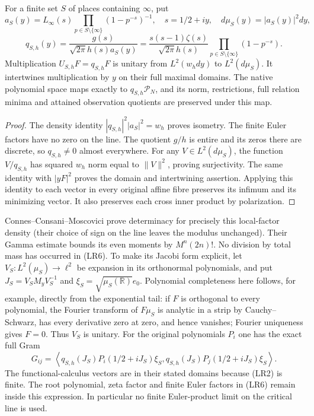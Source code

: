 \begin{hzocproposition}
For a finite set $S$ of places containing $\infty$, put
\[
 a_S(y)=L_\infty(s)\prod_{p\in S\setminus\{\infty\}}
 (1-p^{-s})^{-1},\quad s=1/2+iy,\quad d\mu_S(y)=|a_S(y)|^2dy,
\]
\[
 q_{S,h}(y)=\frac{g(s)}{\sqrt{2\pi}h(s)a_S(y)}
 =\frac{s(s-1)\zeta(s)}{\sqrt{2\pi}h(s)}
 \prod_{p\in S\setminus\{\infty\}}(1-p^{-s}).\tag{LR6}
\]
Multiplication $U_{S,h}F=q_{S,h}F$ is unitary from
$L^2(w_hdy)$ to $L^2(d\mu_S)$. It intertwines multiplication by $y$
on their full maximal domains. The native polynomial space maps exactly
to $q_{S,h}\mathcal P_N$, and its norm, restrictions, full relation
minima and attained observation quotients are preserved under this map.
\end{hzocproposition}
\begin{proof}
The density identity $|q_{S,h}|^2|a_S|^2=w_h$ proves isometry.
The finite Euler factors have no zero on the line. The quotient $g/h$
is entire and its zeros there are discrete, so $q_{S,h}\ne0$ almost
everywhere. For any $V\in L^2(d\mu_S)$, the function $V/q_{S,h}$
has squared $w_h$ norm equal to $\|V\|^2$, proving surjectivity.
The same identity with $|yF|^2$ proves the domain and intertwining
assertion. Applying this identity to each vector in every original
affine fibre preserves its infimum and its minimizing vector.
It also preserves each cross inner product by polarization.
\end{proof}

Connes--Consani--Moscovici \cite[\S3.2, Proposition 3.1]{hzoc:CCM}
prove determinacy for precisely this local-factor density (their
choice of sign on the line leaves the modulus unchanged).
Their Gamma estimate bounds its even moments by $M^n(2n)!$.
No division by total mass has occurred in (LR6). To make its Jacobi
form explicit, let $V_S:L^2(\mu_S)\longrightarrow\ell^2$ be expansion
in its orthonormal polynomials, and put
$J_S=V_SM_yV_S^{-1}$ and $\xi_S=\sqrt{\mu_S(\mathbb R)}e_0$.
Polynomial completeness here follows, for example, directly from
the exponential tail: if $F$ is orthogonal to every polynomial,
the Fourier transform of $F\mu_S$ is analytic in a strip by
Cauchy--Schwarz, has every derivative zero at zero, and hence vanishes;
Fourier uniqueness gives $F=0$. Thus $V_S$ is unitary. For the original
polynomials $P_i$ one has the exact full Gram
\[
 G_{ij}=\left\langle q_{S,h}(J_S)P_i(1/2+iJ_S)\xi_S,
 q_{S,h}(J_S)P_j(1/2+iJ_S)\xi_S\right\rangle.\tag{LR7}
\]
The functional-calculus vectors are in their stated domains because
(LR2) is finite. The root polynomial, zeta factor and finite Euler
factors in (LR6) remain inside this expression. In particular no
finite Euler-product limit on the critical line is used.

